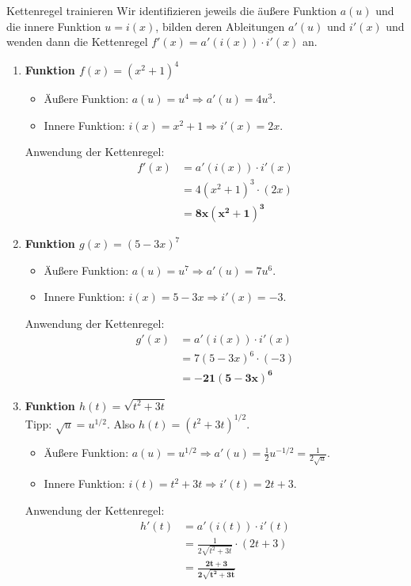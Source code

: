 \begin{loesungsumgebung}{Kettenregel trainieren}
Wir identifizieren jeweils die äußere Funktion $a(u)$ und die innere Funktion $u=i(x)$, bilden deren Ableitungen $a'(u)$ und $i'(x)$ und wenden dann die Kettenregel $f'(x) = a'(i(x)) \cdot i'(x)$ an.

\begin{enumerate}[label=(\alph*)]
    \item \textbf{Funktion $f(x) = (x^2+1)^4$}
    \begin{itemize}
        \item Äußere Funktion: $a(u) = u^4 \Rightarrow a'(u) = 4u^3$.
        \item Innere Funktion: $i(x) = x^2+1 \Rightarrow i'(x) = 2x$.
    \end{itemize}
    Anwendung der Kettenregel:
    \begin{align*}
    f'(x) &= a'(i(x)) \cdot i'(x) \\
          &= 4(x^2+1)^3 \cdot (2x) \\
          &= \mathbf{8x(x^2+1)^3}
    \end{align*}

    \item \textbf{Funktion $g(x) = (5-3x)^7$}
    \begin{itemize}
        \item Äußere Funktion: $a(u) = u^7 \Rightarrow a'(u) = 7u^6$.
        \item Innere Funktion: $i(x) = 5-3x \Rightarrow i'(x) = -3$.
    \end{itemize}
    Anwendung der Kettenregel:
    \begin{align*}
    g'(x) &= a'(i(x)) \cdot i'(x) \\
          &= 7(5-3x)^6 \cdot (-3) \\
          &= \mathbf{-21(5-3x)^6}
    \end{align*}

    \item \textbf{Funktion $h(t) = \sqrt{t^2+3t}$} \\
    Tipp: $\sqrt{u} = u^{1/2}$. Also $h(t) = (t^2+3t)^{1/2}$.
    \begin{itemize}
        \item Äußere Funktion: $a(u) = u^{1/2} \Rightarrow a'(u) = \frac{1}{2}u^{-1/2} = \frac{1}{2\sqrt{u}}$.
        \item Innere Funktion: $i(t) = t^2+3t \Rightarrow i'(t) = 2t+3$.
    \end{itemize}
    Anwendung der Kettenregel:
    \begin{align*}
    h'(t) &= a'(i(t)) \cdot i'(t) \\
          &= \frac{1}{2\sqrt{t^2+3t}} \cdot (2t+3) \\
          &= \mathbf{\frac{2t+3}{2\sqrt{t^2+3t}}}
    \end{align*}


\end{enumerate}
\end{loesungsumgebung}
